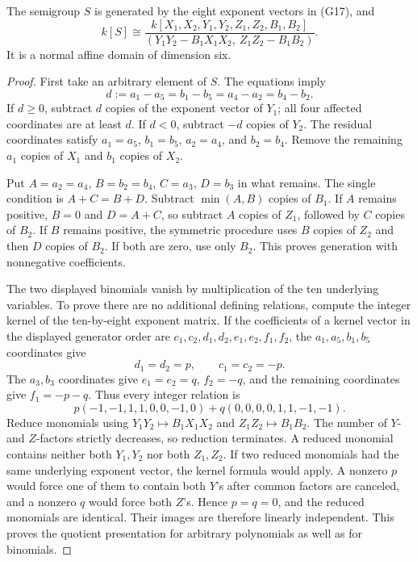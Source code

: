 \begin{theorem}
The semigroup \(S\) is generated by the eight exponent vectors in (G17), and
\[
 k[S]\cong
 \frac{k[X_1,X_2,Y_1,Y_2,Z_1,Z_2,B_1,B_2]}
 {(Y_1Y_2-B_1X_1X_2,\ Z_1Z_2-B_1B_2)}.
 \tag{G18}\label{eq:matching-corrected}
\]
It is a normal affine domain of dimension six.
\end{theorem}
\begin{proof}
First take an arbitrary element of \(S\). The equations imply
\[
 d:=a_1-a_5=b_1-b_5=a_4-a_2=b_4-b_2.
\]
If \(d\ge0\), subtract \(d\) copies of the exponent vector of \(Y_1\); all four affected coordinates are at least \(d\). If \(d<0\), subtract \(-d\) copies of \(Y_2\). The residual coordinates satisfy \(a_1=a_5\), \(b_1=b_5\), \(a_2=a_4\), and \(b_2=b_4\). Remove the remaining \(a_1\) copies of \(X_1\) and \(b_1\) copies of \(X_2\).

Put \(A=a_2=a_4\), \(B=b_2=b_4\), \(C=a_3\), \(D=b_3\) in what remains. The single condition is \(A+C=B+D\). Subtract \(\min(A,B)\) copies of \(B_1\). If \(A\) remains positive, \(B=0\) and \(D=A+C\), so subtract \(A\) copies of \(Z_1\), followed by \(C\) copies of \(B_2\). If \(B\) remains positive, the symmetric procedure uses \(B\) copies of \(Z_2\) and then \(D\) copies of \(B_2\). If both are zero, use only \(B_2\). This proves generation with nonnegative coefficients.

The two displayed binomials vanish by multiplication of the ten underlying variables. To prove there are no additional defining relations, compute the integer kernel of the ten-by-eight exponent matrix. If the coefficients of a kernel vector in the displayed generator order are \(c_1,c_2,d_1,d_2,e_1,e_2,f_1,f_2\), the \(a_1,a_5,b_1,b_5\) coordinates give
\[
 d_1=d_2=p,\qquad c_1=c_2=-p.
\]
The \(a_3,b_3\) coordinates give \(e_1=e_2=q\), \(f_2=-q\), and the remaining coordinates give \(f_1=-p-q\). Thus every integer relation is
\[
 p(-1,-1,1,1,0,0,-1,0)
 +q(0,0,0,0,1,1,-1,-1).
\]
Reduce monomials using \(Y_1Y_2\mapsto B_1X_1X_2\) and
\(Z_1Z_2\mapsto B_1B_2\). The number of \(Y\)- and \(Z\)-factors strictly decreases, so reduction terminates. A reduced monomial contains neither both \(Y_1,Y_2\) nor both \(Z_1,Z_2\).
If two reduced monomials had the same underlying exponent vector, the kernel formula would apply. A nonzero \(p\) would force one of them to contain both \(Y\)'s after common factors are canceled, and a nonzero \(q\) would force both \(Z\)'s. Hence \(p=q=0\), and the reduced monomials are identical. Their images are therefore linearly independent. This proves the quotient presentation for arbitrary polynomials as well as for binomials.


\end{proof}
